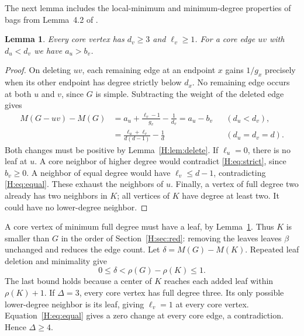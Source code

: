 \documentclass[11pt,a4paper]{article}
\newtheorem{lemma}[theorem]{Lemma}
\theoremstyle{remark}\newtheorem{remark}[theorem]{Remark}
\numberwithin{equation}{section}
\begin{document}
The next lemma includes the local-minimum and minimum-degree properties
of bags from Lemma~4.2 of \cite{H:CPS}.
\begin{lemma}\label{H:lem:local}
Every core vertex has $d_v\ge3$ and $\ell_v\ge1$. For a core edge $uv$
with $d_u<d_v$ we have $a_u>b_v$.
\end{lemma}
\begin{proof}
On deleting $uv$, each remaining edge at an endpoint $x$ gains $1/g_x$
precisely when its other endpoint has degree strictly below $d_x$.
No remaining edge occurs at both $u$ and $v$, since $G$ is simple.
Subtracting the weight of the deleted edge gives
\begin{align}
 M(G-uv)-M(G)
 &=a_u+\frac{\ell_v-1}{g_v}-\frac1{d_v}
   =a_u-b_v &&(d_u<d_v),\label{H:eq:strict}\\
 &=\frac{\ell_u+\ell_v}{d(d-1)}-\frac1d
   &&(d_u=d_v=d).\label{H:eq:equal}
\end{align}
Both changes must be positive by Lemma~\ref{H:lem:delete}. If
$\ell_u=0$, there is no leaf at $u$. A core neighbor of higher degree
would contradict \eqref{H:eq:strict}, since $b_v\ge0$. A neighbor of
equal degree would have $\ell_v\le d-1$, contradicting
\eqref{H:eq:equal}. These exhaust the neighbors of $u$. Finally, a
vertex of full degree two already has two neighbors in $K$; all
vertices of $K$ have degree at least two. It could have no lower-degree
neighbor.
\end{proof}

A core vertex of minimum full degree must have a leaf, by
Lemma~\ref{H:lem:local}. Thus $K$ is smaller than $G$ in the order of
Section~\ref{H:sec:red}: removing the leaves leaves $\beta$ unchanged
and reduces the edge count. Let $\delta=M(G)-M(K)$. Repeated leaf
deletion and minimality give
\begin{equation}\label{H:eq:delta}
 0\le\delta<\rho(G)-\rho(K)\le1 .
\end{equation}
The last bound holds because a center of $K$ reaches each added leaf
within $\rho(K)+1$. If $\Delta=3$, every core vertex has full degree
three. Its only possible lower-degree neighbor is its leaf, giving
$\ell_v=1$ at every core vertex. Equation~\eqref{H:eq:equal} gives a
zero change at every core edge, a contradiction. Hence $\Delta\ge4$.
\end{document}
